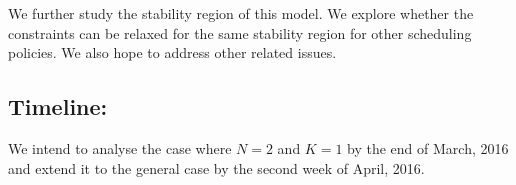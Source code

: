 \documentclass[a4paper,english,11pt]{article}
\begin{document}
We further study the stability region of this model. We explore whether the constraints can be relaxed for the same stability region for other scheduling policies. We also hope to address other related issues.
\subsection*{Timeline:}
We intend to analyse the case where $N=2$ and $K=1$ by the end of March, 2016 and extend it to the general case by the second week of April, 2016. 
\end{document}
